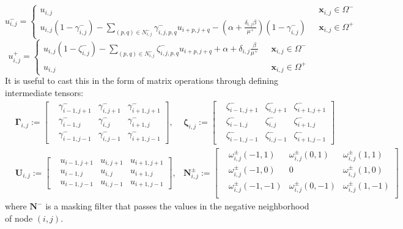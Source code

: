 \documentclass{elsarticle}
\begin{document}
\begin{equation}
	u_{i,j}^-=\begin{cases}
		u_{i,j}                                                                                                                                                 & \text{ $\mathbf{x}_{i,j}\in \Omega^-$} \\
		u_{i,j} (1 - \gamma_{i,j}^- ) - \sum_{(p,q)\in N_{i,j}^-} \gamma_{i,j,p,q}^- u_{i+p,j+q} - (\alpha + \frac{\delta_{i,j}\beta}{\mu^+})(1-\gamma^-_{i,j}) & \text{ $\mathbf{x}_{i,j}\in \Omega^+$}
	\end{cases}
\end{equation}
\begin{equation}
	u_{i,j}^+=\begin{cases}
		u_{i,j}(1 - \zeta^-_{i,j} ) - \sum_{(p,q)\in N_{i,j}^-} \zeta^-_{i,j,p,q}u_{i+p,j+q}  + \alpha + \delta_{i,j}\frac{\beta}{\mu^+} & \text{ $\mathbf{x}_{i,j}\in \Omega^-$} \\
		u_{i,j}                                                                                                                          & \text{ $\mathbf{x}_{i,j}\in \Omega^+$}
	\end{cases}
\end{equation}
It is useful to cast this in the form of matrix operations through defining intermediate tensors:
\begin{align*}
	 & \boldsymbol{\Gamma}_{i,j} := \begin{bmatrix}
		 & \gamma_{i-1,j+1}^- & \gamma^-_{i,j+1} & \gamma^-_{i+1,j+1} \\
		 & \gamma_{i-1,j}^-   & \gamma^-_{i,j}   & \gamma^-_{i+1,j}   \\
		 & \gamma_{i-1,j-1}^- & \gamma^-_{i,j-1} & \gamma^-_{i+1,j-1}
	\end{bmatrix}, & \boldsymbol{\zeta}_{i,j} := \begin{bmatrix}
		 & \zeta^-_{i-1,j+1} & \zeta^-_{i,j+1} & \zeta^-_{i+1,j+1} \\
		 & \zeta^-_{i-1,j}   & \zeta^-_{i,j}   & \zeta^-_{i+1,j}   \\
		 & \zeta^-_{i-1,j-1} & \zeta^-_{i,j-1} & \zeta^-_{i+1,j-1}
	\end{bmatrix} \\
	 & \mathbf{U}_{i,j} := \begin{bmatrix}
		 & u_{i-1,j+1} & u_{i,j+1} & u_{i+1, j+1} \\
		 & u_{i-1,j}   & u_{i,j}   & u_{i+1, j}   \\
		 & u_{i-1,j-1} & u_{i,j-1} & u_{i+1, j-1}
	\end{bmatrix},          & \mathbf{N}^\pm_{i,j} :=\begin{bmatrix}
		 & \omega_{i,j}^\pm(-1,1)  & \omega_{i,j}^\pm(0,1)  & \omega_{i,j}^\pm(1,1)  \\
		 & \omega_{i,j}^\pm(-1,0)  & 0                      & \omega_{i,j}^\pm(1,0)  \\
		 & \omega_{i,j}^\pm(-1,-1) & \omega_{i,j}^\pm(0,-1) & \omega_{i,j}^\pm(1,-1) \\
	\end{bmatrix}
\end{align*}
where $\mathbf{N^-}$ is a masking filter that passes the values in the negative neighborhood of node $(i,j)$.
\end{document}
